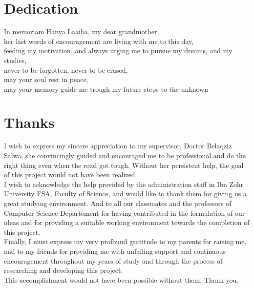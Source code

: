 

\chapter*{Dedication}
\thispagestyle{empty}
%
\vspace*{\fill}

\begin{center}
  In memoriam Hanya Laaiba, my dear grandmother, ~ \\
  her last words of encouragement are living with me to this day, ~ \\
  feeding my motivation, and always urging me to pursue my dreams, and my studies, ~\\
  never to be forgotten, never to be erased, ~ \\
  may your soul rest in peace, ~ \\
  may your memory guide me trough my future steps to the unknown ~ \\


\end{center}
%
\vspace*{\fill}

%
%
%
%
%
%
\cleardoublepage%
\chapter*{Thanks}
\thispagestyle{empty}
%

I wish to express my sincere appreciation to my supervisor, Doctor Belaqziz Salwa, she convincingly guided and encouraged me to be professional and do the right thing even when the road got tough. Without her persistent help, the goal of this project would not have been realized.\\
I wish to acknowledge the help provided by the administration staff in Ibn Zohr University \ac{FSA}, Faculty of Science, and would like to thank them for giving us a great studying environment. And to all our classmates and the professors of Computer Science Departement for having contributed in the formulation of our ideas and for providing a suitable working environment towards the completion of this project.\\
Finally, I must express my very profound gratitude to my parents for raising me, and to my friends for providing me with unfailing support and continuous encouragement throughout my years of study and through the process of researching and developing this project. \\
This accomplishment would not have been possible without them. Thank you.

